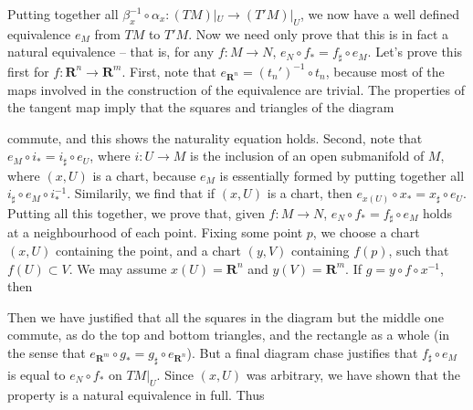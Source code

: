 Putting together all $\beta_x^{-1} \circ \alpha_x: (TM)|_U \to (T'M)|_U$, we now have a well defined equivalence $e_M$ from $TM$ to $T'M$. Now we need only prove that this is in fact a natural equivalence -- that is, for any $f: M \to N$, $e_N \circ f_* = f_\sharp \circ e_M$. Let's prove this first for $f: \mathbf{R}^n \to \mathbf{R}^m$. First, note that $e_{\mathbf{R}^n} = (t_n')^{-1} \circ t_n$, because most of the maps involved in the construction of the equivalence are trivial. The properties of the tangent map imply that the squares and triangles of the diagram
%
\begin{center}
\end{center}
%
commute, and this shows the naturality equation holds. Second, note that $e_M \circ i_* = i_\sharp \circ e_U$, where $i: U \to M$ is the inclusion of an open submanifold of $M$, where $(x,U)$ is a chart, because $e_M$ is essentially formed by putting together all $i_\sharp \circ e_M \circ i_*^{-1}$. Similarily, we find that if $(x,U)$ is a chart, then $e_{x(U)} \circ x_* = x_\sharp \circ e_U$. Putting all this together, we prove that, given $f:M \to N$, $e_N \circ f_* = f_\sharp \circ e_M$ holds at a neighbourhood of each point. Fixing some point $p$, we choose a chart $(x,U)$ containing the point, and a chart $(y,V)$ containing $f(p)$, such that $f(U) \subset V$. We may assume $x(U) = \mathbf{R}^n$ and $y(V) = \mathbf{R}^m$. If $g = y \circ f \circ x^{-1}$, then
%
\begin{center}
\end{center}
%
Then we have justified that all the squares in the diagram but the middle one commute, as do the top and bottom triangles, and the rectangle as a whole (in the sense that $e_{\mathbf{R}^m} \circ g_* = g_\sharp \circ e_{\mathbf{R}^n}$). But a final diagram chase justifies that $f_\sharp \circ e_M$ is equal to $e_N \circ f_*$ on $TM|_U$. Since $(x,U)$ was arbitrary, we have shown that the property is a natural equivalence in full. Thus

